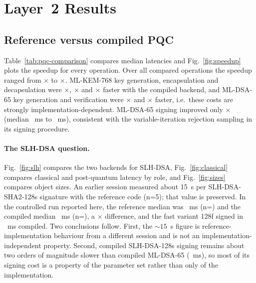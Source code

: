 \section{Layer~2 Results}\label{sec:l2res}
\subsection{Reference versus compiled PQC}
Table~\ref{tab:pqc-comparison} compares median latencies and Fig.~\ref{fig:speedup} plots the speedup for every operation. Over all compared operations the speedup ranged from \SpeedupMin{}$\times$ to \SpeedupMax{}$\times$. ML-KEM-768 key generation, encapsulation and decapsulation were \SpeedupMlkemKeygen{}$\times$, \SpeedupMlkemEncaps{}$\times$ and \SpeedupMlkemDecaps{}$\times$ faster with the compiled backend, and ML-DSA-65 key generation and verification were \SpeedupMldsaKeygen{}$\times$ and \SpeedupMldsaVerify{}$\times$ faster, i.e.\ these costs are strongly implementation-dependent. ML-DSA-65 signing improved only \SpeedupMldsaSign{}$\times$ (median \RefMldsaSignMs{}~ms to \OptMldsaSignMs{}~ms), consistent with the variable-iteration rejection sampling in its signing procedure.



\paragraph{The SLH-DSA question.} Fig.~\ref{fig:slh} compares the two backends for SLH-DSA, Fig.~\ref{fig:classical} compares classical and post-quantum latency by role, and Fig.~\ref{fig:sizes} compares object sizes. An earlier session measured about 15~s per SLH-DSA-SHA2-128s signature with the reference code (n=5); that value is preserved. In the controlled run reported here, the reference median was \RefSlhSSignMs{}~ms (n=\SlhSRefN{}) and the compiled median \OptSlhSSignMs{}~ms (n=\SlhSOptN{}), a \SpeedupSlhSSign{}$\times$ difference, and the fast variant 128f signed in \OptSlhFSignMs{}~ms compiled. Two conclusions follow. First, the ${\sim}15$~s figure is reference-implementation behaviour from a different session and is not an implementation-independent property. Second, compiled SLH-DSA-128s signing remains about two orders of magnitude slower than compiled ML-DSA-65 (\OptMldsaSignMs{}~ms), so most of its signing cost is a property of the parameter set rather than only of the implementation.

